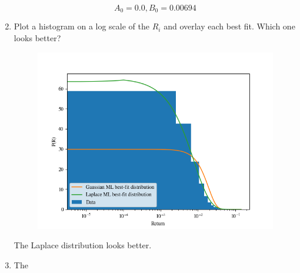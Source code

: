 \begin{enumerate}[label=\textbf{\Alph*}.]
    $$A_0=0.0, B_0=0.00694$$

    \item Plot a histogram on a log scale of the $R_i$ and overlay each best fit. Which one looks better?

    \begin{figure}[H]
        \begin{center}
            \includegraphics[width=\textwidth]{q1_return_hist.png}
        \end{center}
    \end{figure}

    The Laplace distribution looks better.

    \item The 

\end{enumerate}
